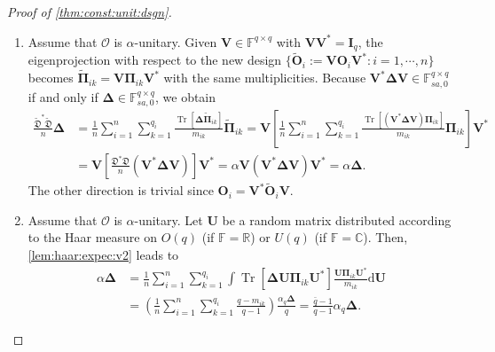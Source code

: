 \documentclass[noinfoline]{imsart}\setcounter{tocdepth}{2}
\renewcommand{\b}[1]{\mathbb{#1}} %
\newcommand{\m}[1]{\mathbf{#1}} %
\newcommand{\s}[1]{\mathscr{#1}} %
\newcommand{\f}[1]{\mathfrak{#1}} %
\newcommand{\mb}[1]{\boldsymbol{#1}} %
\newcommand{\rd}{\mathrm{d}} %
\newcommand{\tr}[1]{\operatorname{Tr}\left[#1\right]}
\theoremstyle{plain}
\begin{document}
\begin{appendix}
\begin{proof}[Proof of \cref{thm:const:unit:dsgn}]
\quad
\begin{enumerate}[leftmargin = *]
\item Assume that $\s{O}$ is $\alpha$-unitary. Given $\m{V} \in \b{F}^{q \times q}$ with $\m{V} \m{V}^{*} = \m{I}_{q}$, the eigenprojection with respect to the new design $\{\tilde{\m{O}}_{i} := \m{V} \m{O}_{i} \m{V}^{*}: i = 1, \cdots, n\}$ becomes $\tilde{\m{\Pi}}_{ik} = \m{V} \m{\Pi}_{ik} \m{V}^{*}$ with the same multiplicities. Because $\m{V}^{*} \mb{\Delta} \m{V} \in \b{F}_{sa, 0}^{q \times q}$ if and only if $\mb{\Delta} \in \b{F}_{sa, 0}^{q \times q}$, we obtain
\begin{align*}
    \frac{\tilde{\f{D}}^{*} \tilde{\f{D}}}{n} \mb{\Delta} &= \frac{1}{n} \sum_{i=1}^{n} \sum_{k=1}^{q_{i}} \frac{\tr{\mb{\Delta} \tilde{\m{\Pi}}_{ik}}}{m_{ik}} \tilde{\m{\Pi}}_{ik} = \m{V} \left[ \frac{1}{n} \sum_{i=1}^{n} \sum_{k=1}^{q_{i}} \frac{\tr{(\m{V}^{*} \mb{\Delta} \m{V}) \m{\Pi}_{ik}}}{m_{ik}} \m{\Pi}_{ik} \right] \m{V}^{*} \\
    &= \m{V} \left[ \frac{\f{D}^{*} \f{D}}{n} (\m{V}^{*} \mb{\Delta} \m{V}) \right] \m{V}^{*} = \alpha \m{V} (\m{V}^{*} \mb{\Delta} \m{V}) \m{V}^{*} = \alpha \mb{\Delta}.
\end{align*}
The other direction is trivial since $\m{O}_{i} = \m{V}^{*} \tilde{\m{O}}_{i} \m{V}$.

\item Assume that $\s{O}$ is $\alpha$-unitary. Let $\m{U}$ be a random matrix distributed according to the Haar measure on $O(q)$ (if $\b{F} = \b{R}$) or $U(q)$ (if $\b{F} = \b{C}$). Then, \cref{lem:haar:expec:v2} leads to 
\begin{align*}
    \alpha \mb{\Delta} &= \frac{1}{n} \sum_{i=1}^{n} \sum_{k=1}^{q_{i}} \int \tr{\mb{\Delta} \m{U} \m{\Pi}_{ik} \m{U}^{*}} \frac{\m{U} \m{\Pi}_{ik} \m{U}^{*}}{m_{ik}} \rd \m{U} \\
    &= \left( \frac{1}{n} \sum_{i=1}^{n} \sum_{k=1}^{q_{i}} \frac{q - m_{ik}}{q-1}  \right) \frac{\alpha_{q} {\mb{\Delta}}}{q} 
    = \frac{\bar{q} - 1}{q-1} \alpha_{q} \mb{\Delta}.
\end{align*}
\end{enumerate}
\end{proof}




\end{appendix}
\end{document}

